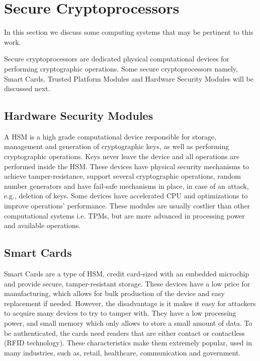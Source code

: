 \section{Secure Cryptoprocessors}\label{chap:background:cryptoprocessors}

In this section we discuss some computing systems that may be pertinent to this work. 

Secure cryptoprocessors are dedicated physical computational devices for performing cryptographic operations. Some secure cryptoprocessors namely, Smart Cards, Trusted Platform Modules and Hardware Security Modules will be discussed next.

\subsection{Hardware Security Modules}\label{chap:background:computing:hsm}

A \ac{HSM} is a high grade computational device responsible for storage, management and generation of cryptographic keys, as well as performing cryptographic operations. Keys never leave the device and all operations are performed inside the \ac{HSM}. These devices have physical security mechanisms to achieve tamper-resistance, support several cryptographic operations, random number generators and have fail-safe mechanisms in place, in case of an attack, e.g., deletion of keys. Some devices have accelerated \ac{CPU} and optimizations to improve operations' performance.
These modules are usually costlier than other computational systems i.e. \ac{TPM}s, but are more advanced in processing power and available operations.

\subsection*{Smart Cards}\label{chap:background:computing:smartcards}
Smart Cards are a type of \ac{HSM}, credit card-sized with an embedded microchip and provide secure, tamper-resistant storage. These devices have a low price for manufacturing, which allows for bulk production of the device and easy replacement if needed. However, the disadvantage is it makes it easy for attackers to acquire many devices to try to tamper with. They have a low processing power, and small memory which only allows to store a small amount of data. To be authenticated, the cards need readers that are either contact or contactless (RFID technology). These characteristics make them extremely popular, used in many industries, such as, retail, healthcare, communication and government.

